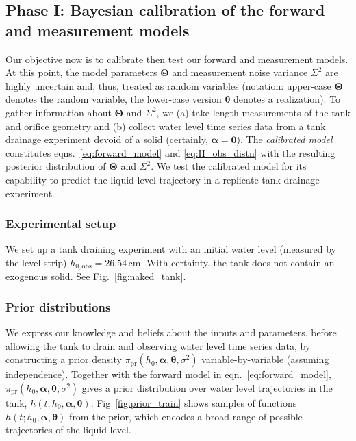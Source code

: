 \documentclass[a4paper,fleqn]{cas-dc}
\newcommand\themodel {$h(t; h_0, \boldsymbol \alpha, \boldsymbol\theta)$\xspace}
\begin{document}
\subsection{Phase I: Bayesian calibration of the forward and measurement models}
\label{sec:phaseI}
Our objective now is to calibrate then test our forward and measurement models.
At this point, the model parameters $\boldsymbol \Theta$ and measurement noise variance $\Sigma^2$ are highly uncertain and, thus, treated as random variables (notation: upper-case $\boldsymbol \Theta$ denotes the random variable, the lower-case version $\boldsymbol \theta$ denotes a realization).
To gather information about $\boldsymbol \Theta$ and $\Sigma^2$, we (a) take length-measurements of the tank and orifice geometry and (b) collect water level time series data from a tank drainage experiment devoid of a solid (certainly, $\boldsymbol \alpha = \mathbf{0}$).
The \emph{calibrated model} constitutes eqns.~\ref{eq:forward_model} and \ref{eq:H_obs_distn} with the resulting posterior distribution of $\boldsymbol \Theta$ and $\Sigma^2$. We test the calibrated model for its capability to predict the liquid level trajectory in a replicate tank drainage experiment.


\subsubsection{Experimental setup}
We set up a tank draining experiment with an initial water level (measured by the level strip) $h_{0, \text{obs}}=26.54$\,cm. 
With certainty, the tank does not contain an exogenous solid. See Fig.~\ref{fig:naked_tank}.

\subsubsection{Prior distributions} 
We express our knowledge and beliefs about the inputs and parameters, before allowing the tank to drain and observing water level time series data, by constructing a prior density $\pi_{\text{pr}}(h_0, \boldsymbol \alpha, \boldsymbol \theta, \sigma^2)$ variable-by-variable (assuming independence). Together with the forward model in eqn.~\ref{eq:forward_model}, $\pi_{\text{pr}}(h_0, \boldsymbol \alpha, \boldsymbol \theta, \sigma^2)$ gives a prior distribution over water level trajectories in the tank, \themodel. 
Fig~\ref{fig:prior_train} shows samples of functions \themodel from the prior, which encodes a broad range of possible trajectories of the liquid level. 
\end{document}
